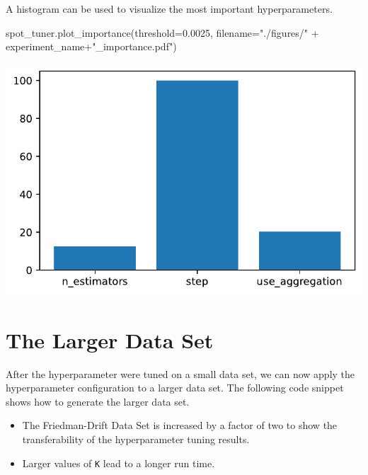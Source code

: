 \documentclass[
  letterpaper,
  DIV=11,
  numbers=noendperiod]{scrreprt}
\newenvironment{Shaded}{\begin{snugshade}}{\end{snugshade}}
\newcommand{\FloatTok}[1]{\textcolor[rgb]{0.68,0.00,0.00}{#1}}
\newcommand{\NormalTok}[1]{\textcolor[rgb]{0.00,0.23,0.31}{#1}}
\newcommand{\OperatorTok}[1]{\textcolor[rgb]{0.37,0.37,0.37}{#1}}
\newcommand{\StringTok}[1]{\textcolor[rgb]{0.13,0.47,0.30}{#1}}
\providecommand{\tightlist}{%
  \setlength{\itemsep}{0pt}\setlength{\parskip}{0pt}}\usepackage{longtable,booktabs,array}
\begin{document}
A histogram can be used to visualize the most important hyperparameters.

\begin{Shaded}
\begin{Highlighting}[]
\NormalTok{spot\_tuner.plot\_importance(threshold}\OperatorTok{=}\FloatTok{0.0025}\NormalTok{, filename}\OperatorTok{=}\StringTok{"./figures/"} \OperatorTok{+}\NormalTok{ experiment\_name}\OperatorTok{+}\StringTok{"\_importance.pdf"}\NormalTok{)}
\end{Highlighting}
\end{Shaded}

\includegraphics{025_spot_hpt_river_friedman_amfr_files/figure-pdf/cell-22-output-1.pdf}

\section{The Larger Data Set}\label{the-larger-data-set-1}

After the hyperparameter were tuned on a small data set, we can now
apply the hyperparameter configuration to a larger data set. The
following code snippet shows how to generate the larger data set.

\begin{tcolorbox}[enhanced jigsaw, coltitle=black, bottomrule=.15mm, breakable, toprule=.15mm, colframe=quarto-callout-caution-color-frame, title=\textcolor{quarto-callout-caution-color}{\faFire}\hspace{0.5em}{Caution: Increased Friedman-Drift Data Set}, colbacktitle=quarto-callout-caution-color!10!white, opacityback=0, left=2mm, leftrule=.75mm, colback=white, rightrule=.15mm, bottomtitle=1mm, toptitle=1mm, titlerule=0mm, arc=.35mm, opacitybacktitle=0.6]

\begin{itemize}
\tightlist
\item
  The Friedman-Drift Data Set is increased by a factor of two to show
  the transferability of the hyperparameter tuning results.
\item
  Larger values of \texttt{K} lead to a longer run time.
\end{itemize}

\end{tcolorbox}
\end{document}
